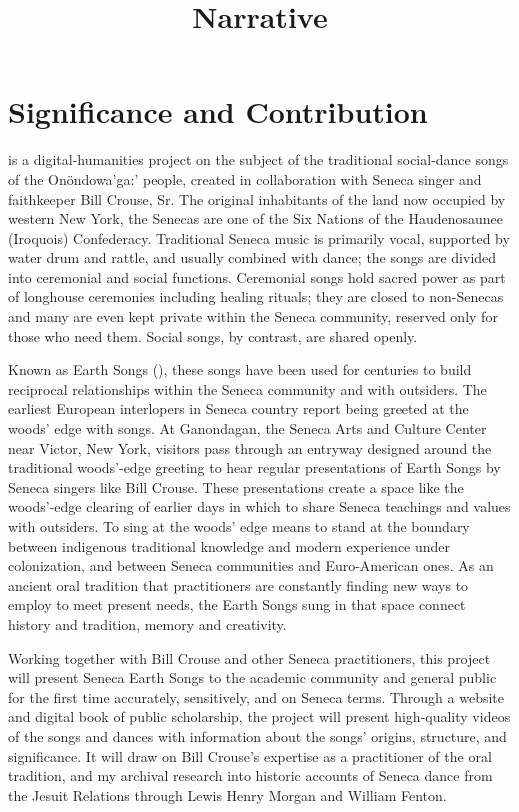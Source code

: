 \documentclass{neh}
\title{Narrative}
\begin{document}
\maketitle
\section{Significance and Contribution}
 is a digital-humanities project
on the subject of the traditional social-dance songs of the Onöndowa’ga:’
people, created in collaboration with Seneca singer and faithkeeper Bill
Crouse, Sr.
The original inhabitants of the land now occupied by western New York, the
Senecas are one of the Six Nations of the Haudenosaunee (Iroquois)
Confederacy.
Traditional Seneca music is primarily vocal, supported by water drum and
rattle, and usually combined with dance; the songs are divided into ceremonial
and social functions.
Ceremonial songs hold sacred power as part of longhouse ceremonies including
healing rituals; they are closed to non-Senecas and many are even kept private
within the Seneca community, reserved only for those who need them.
Social songs, by contrast, are shared openly.

Known as Earth Songs (), these songs have been
used for centuries to build reciprocal relationships within the Seneca
community and with outsiders.
The earliest European interlopers in Seneca country report being greeted at
the woods' edge with songs.
At Ganondagan, the Seneca Arts and Culture Center near Victor, New York,
visitors pass through an entryway designed around the traditional woods'-edge
greeting to hear regular presentations of Earth Songs by Seneca singers like
Bill Crouse.
These presentations create a space like the woods'-edge clearing of earlier
days in which to share Seneca teachings and values with outsiders.
To sing at the woods' edge means to stand at the boundary between indigenous
traditional knowledge and modern experience under colonization, and between
Seneca communities and Euro-American ones.
As an ancient oral tradition that practitioners are constantly finding new
ways to employ to meet present needs, the Earth Songs sung in that space
connect history and tradition, memory and creativity.

Working together with Bill Crouse and other Seneca practitioners, this project
will present Seneca Earth Songs to the academic community and general public
for the first time accurately, sensitively, and on Seneca terms.
Through a website and digital book of public scholarship, the project will
present high-quality videos of the songs and dances with information about
the songs' origins, structure, and significance.
It will draw on Bill Crouse's expertise as a practitioner of the oral
tradition, and my archival research into historic accounts of Seneca dance
from the Jesuit Relations through Lewis Henry Morgan and William Fenton.
\end{document}
